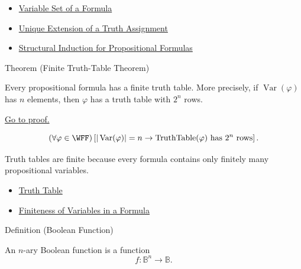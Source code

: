 \begin{dependencies}
\begin{itemize}
  \item \hyperref[def:formula-variable-set-propositional-logic]{Variable Set of a Formula}
  \item \hyperref[thm:unique-extension-truth-assignment-propositional-logic]{Unique Extension of a Truth Assignment}
  \item \hyperref[thm:structural-induction-propositional-formulas]{Structural Induction for Propositional Formulas}
\end{itemize}
\end{dependencies}
\begin{theorembox}{Theorem (Finite Truth-Table Theorem)}
\begin{theorem}
\label{thm:finite-truth-table-propositional-logic}
Every propositional formula has a finite truth table. More precisely, if \(\operatorname{Var}(\varphi)\) has \(n\) elements, then \(\varphi\) has a truth table with \(2^n\) rows.

\noindent\hyperref[prf:finite-truth-table-propositional-logic]{Go to proof.}
\end{theorem}
\end{theorembox}

\begin{remark*}
\[
(\forall\varphi\in\WFF)
\left[
|\operatorname{Var}(\varphi)|=n
\to
\operatorname{TruthTable}(\varphi)\text{ has }2^n\text{ rows}
\right].
\]
\end{remark*}

\begin{remark*}[Interpretation]
Truth tables are finite because every formula contains only finitely many propositional variables.
\end{remark*}

\begin{dependencies}
\begin{itemize}
  \item \hyperref[def:truth-table-propositional-logic]{Truth Table}
  \item \hyperref[lem:finiteness-of-variables-propositional-formulas]{Finiteness of Variables in a Formula}
\end{itemize}
\end{dependencies}
\begin{definitionbox}{Definition (Boolean Function)}
\begin{definition}
\label{def:boolean-function-propositional-logic}
An \(n\)-ary Boolean function is a function
\[
f:\mathbb{B}^n\to\mathbb{B}.
\]
\end{definition}
\end{definitionbox}

